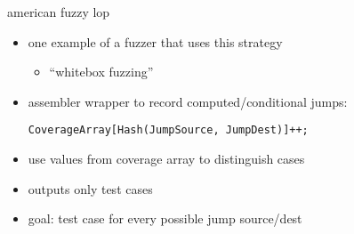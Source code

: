 \begin{frame}
\end{frame}

\begin{frame}[fragile,label=afl]{american fuzzy lop}
    \begin{itemize}
        \item one example of a fuzzer that uses this strategy
            \begin{itemize}
            \item ``whitebox fuzzing''
            \end{itemize}
        \vspace{.5cm}
        \item assembler wrapper to record computed/conditional jumps:
\begin{lstlisting}
CoverageArray[Hash(JumpSource, JumpDest)]++;
\end{lstlisting}
        \item use values from coverage array to distinguish cases
        \item outputs only  test cases
        \item goal: test case for every possible jump source/dest
    \end{itemize}
\end{frame}

